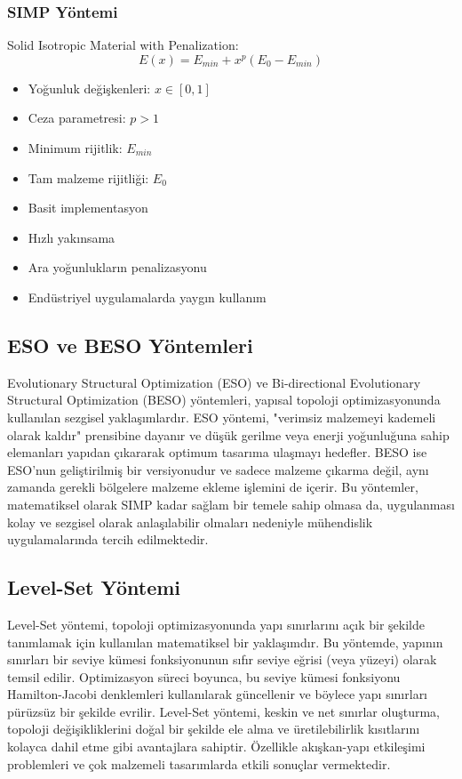 \subsubsection{SIMP Yöntemi}
Solid Isotropic Material with Penalization:
\begin{equation}
E(x) = E_{min} + x^p(E_0 - E_{min})
\end{equation}

\begin{itemize}
    \item Yoğunluk değişkenleri: $x \in [0,1]$
    \item Ceza parametresi: $p > 1$
    \item Minimum rijitlik: $E_{min}$
    \item Tam malzeme rijitliği: $E_0$
\end{itemize}

\begin{tcolorbox}[title=SIMP Yönteminin Avantajları]
\begin{itemize}
    \item Basit implementasyon
    \item Hızlı yakınsama
    \item Ara yoğunlukların penalizasyonu
    \item Endüstriyel uygulamalarda yaygın kullanım
\end{itemize}
\end{tcolorbox}

\subsection{ESO ve BESO Yöntemleri}
Evolutionary Structural Optimization (ESO) ve Bi-directional Evolutionary Structural Optimization (BESO) yöntemleri, yapısal topoloji optimizasyonunda kullanılan sezgisel yaklaşımlardır. ESO yöntemi, "verimsiz malzemeyi kademeli olarak kaldır" prensibine dayanır ve düşük gerilme veya enerji yoğunluğuna sahip elemanları yapıdan çıkararak optimum tasarıma ulaşmayı hedefler. BESO ise ESO'nun geliştirilmiş bir versiyonudur ve sadece malzeme çıkarma değil, aynı zamanda gerekli bölgelere malzeme ekleme işlemini de içerir. Bu yöntemler, matematiksel olarak SIMP kadar sağlam bir temele sahip olmasa da, uygulanması kolay ve sezgisel olarak anlaşılabilir olmaları nedeniyle mühendislik uygulamalarında tercih edilmektedir.

\subsection{Level-Set Yöntemi}
Level-Set yöntemi, topoloji optimizasyonunda yapı sınırlarını açık bir şekilde tanımlamak için kullanılan matematiksel bir yaklaşımdır. Bu yöntemde, yapının sınırları bir seviye kümesi fonksiyonunun sıfır seviye eğrisi (veya yüzeyi) olarak temsil edilir. Optimizasyon süreci boyunca, bu seviye kümesi fonksiyonu Hamilton-Jacobi denklemleri kullanılarak güncellenir ve böylece yapı sınırları pürüzsüz bir şekilde evrilir. Level-Set yöntemi, keskin ve net sınırlar oluşturma, topoloji değişikliklerini doğal bir şekilde ele alma ve üretilebilirlik kısıtlarını kolayca dahil etme gibi avantajlara sahiptir. Özellikle akışkan-yapı etkileşimi problemleri ve çok malzemeli tasarımlarda etkili sonuçlar vermektedir.
